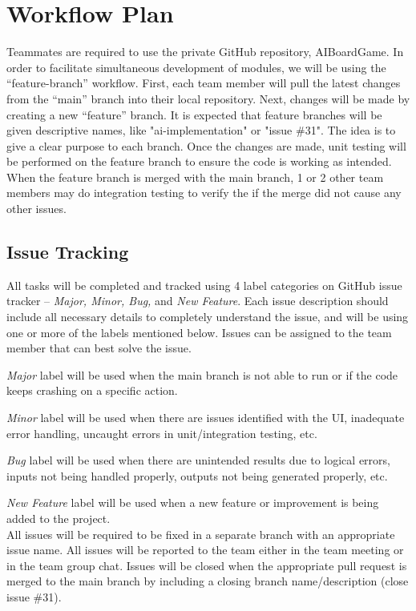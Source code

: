 \documentclass{article}
\begin{document}
\section{Workflow Plan}
Teammates are required to use the private GitHub repository, AIBoardGame. 
In order to facilitate simultaneous development of modules, we will be using the “feature-branch” workflow. First, each team member will pull the latest changes from the “main” branch into their local repository. 
Next, changes will be made by creating a new “feature” branch. It is expected that feature branches will be given descriptive names, like "ai-implementation" or "issue \#31". The idea is to give a clear purpose to each branch. 
Once the changes are made, unit testing will be performed on the feature branch to ensure the code is working as intended. 
When the feature branch is merged with the main branch, 1 or 2 other team members may do integration testing to verify the if the merge did not cause any other issues. 

\subsection{Issue Tracking}
All tasks will be completed and tracked using 4 label categories on GitHub issue tracker – \emph{Major, Minor, Bug,} and \emph{New Feature}. Each issue description should include all necessary details to completely understand the issue, and will be using one or more of the labels mentioned below. Issues can be assigned to the team member that can best solve the issue.

\emph{Major} label will be used when the main branch is not able to run or if the code keeps crashing on a specific action.

\emph{Minor} label will be used when there are issues identified with the UI, inadequate error handling, uncaught errors in unit/integration testing, etc.

\emph{Bug} label will be used when there are unintended results due to logical errors, inputs not being handled properly, outputs not being generated properly, etc.

\emph{New Feature} label will be used when a new feature or improvement is being added to the project.
\\All issues will be required to be fixed in a separate branch with an appropriate issue name. All issues will be reported to the team either in the team meeting or in the team group chat. Issues will be closed when the appropriate pull request is merged to the main branch by including a closing branch name/description (close issue \#31).
\end{document}
